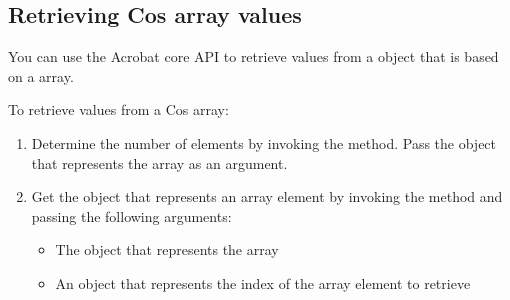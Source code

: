\documentclass[letterpaper,12pt,english,openany,oneside]{sphinxmanual}
\begin{document}
\begin{sphinxVerbatim}[commandchars=\\\{\}]
    
  
   
     

    

       
     


      
   
\end{sphinxVerbatim}


\subsection{Retrieving Cos array values}
\label{\detokenize{Plugins_Cos:retrieving-cos-array-values}}
You can use the Acrobat core API to retrieve values from a  object that is based on a  array.

To retrieve values from a Cos array:
\begin{enumerate}
%
\item {} 
Determine the number of elements by invoking the  method. Pass the  object that represents the  array as an argument.

\item {} 
Get the  object that represents an array element by invoking the  method and passing the following arguments:
\begin{itemize}
\item {} 
The  object that represents the  array

\item {} 
An  object that represents the index of the array element to retrieve

\end{itemize}

\end{enumerate}
\end{document}
